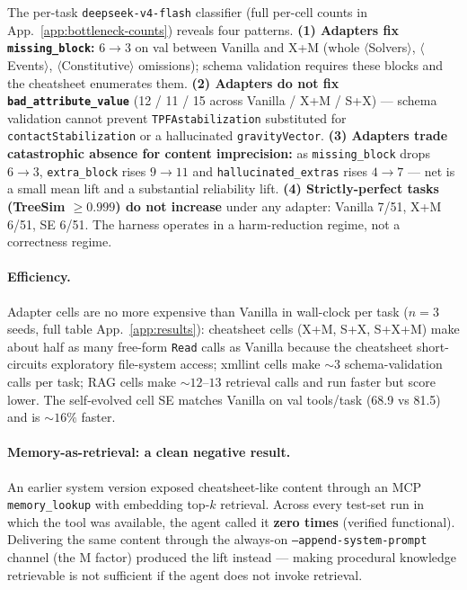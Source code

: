 \documentclass{article}
\begin{document}
The per-task \texttt{deepseek-v4-flash} classifier (full per-cell counts in App.~\ref{app:bottleneck-counts}) reveals four patterns. \textbf{(1) Adapters fix \texttt{missing\_block}:} $6{\to}3$ on val between Vanilla and X+M (whole $\langle$Solvers$\rangle$, $\langle$Events$\rangle$, $\langle$Constitutive$\rangle$ omissions); schema validation requires these blocks and the cheatsheet enumerates them. \textbf{(2) Adapters do not fix \texttt{bad\_attribute\_value}} (12 / 11 / 15 across Vanilla / X+M / S+X) --- schema validation cannot prevent \texttt{TPFAstabilization} substituted for \texttt{contactStabilization} or a hallucinated \texttt{gravityVector}. \textbf{(3) Adapters trade catastrophic absence for content imprecision:} as \texttt{missing\_block} drops $6{\to}3$, \texttt{extra\_block} rises $9{\to}11$ and \texttt{hallucinated\_extras} rises $4{\to}7$ — net is a small mean lift and a substantial reliability lift. \textbf{(4) Strictly-perfect tasks (TreeSim $\geq 0.999$) do not increase} under any adapter: Vanilla 7/51, X+M 6/51, SE 6/51. The harness operates in a harm-reduction regime, not a correctness regime.

\paragraph{Efficiency.}\label{subsec:efficiency} Adapter cells are no more expensive than Vanilla in wall-clock per task ($n=3$ seeds, full table App.~\ref{app:results}): cheatsheet cells (X+M, S+X, S+X+M) make about half as many free-form \texttt{Read} calls as Vanilla because the cheatsheet short-circuits exploratory file-system access; xmllint cells make ${\sim}3$ schema-validation calls per task; RAG cells make ${\sim}12$--$13$ retrieval calls and run faster but score lower. The self-evolved cell SE matches Vanilla on val tools/task (68.9 vs 81.5) and is ${\sim}16\%$ faster.

\paragraph{Memory-as-retrieval: a clean negative result.}\label{subsec:memory-negative} An earlier system version exposed cheatsheet-like content through an MCP \texttt{memory\_lookup} with embedding top-$k$ retrieval. Across every test-set run in which the tool was available, the agent called it \textbf{zero times} (verified functional). Delivering the same content through the always-on \texttt{--append-system-prompt} channel (the M factor) produced the lift instead --- making procedural knowledge retrievable is not sufficient if the agent does not invoke retrieval.
\end{document}
